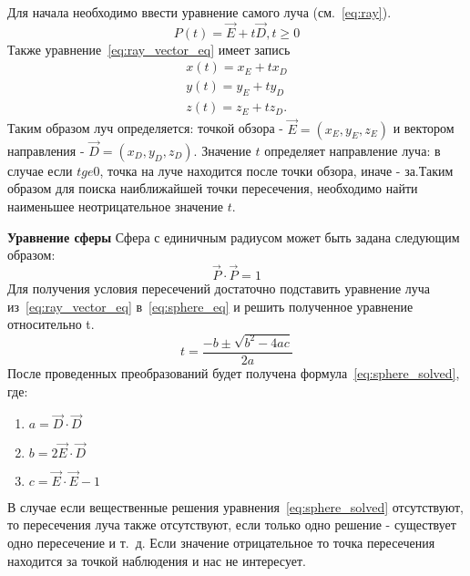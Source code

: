 Для начала необходимо ввести уравнение самого луча (см.~\ref{eq:ray}).
\begin{equation} 
	P(t) = \vec{E} +t\vec{D},t \ge 0
	\label{eq:ray_vector_eq}
\end{equation}
Также уравнение~\ref{eq:ray_vector_eq} имеет запись
\begin{equation}
	\label{eq:ray_scalar_eq}
	\begin{aligned}
		x(t) = x_E + t x_D \\
		y(t) = y_E + t y_D \\
		z(t) = z_E + t z_D.
	\end{aligned}
\end{equation}
Таким образом луч определяется: точкой обзора - $\vec{E} = (x_E,y_E,z_E)$ и вектором направления - $\vec{D} = (x_D,y_D,z_D)$. Значение $t$  определяет направление луча: в случае если $t ge 0$,
точка на луче находится после точки обзора, иначе - за.Таким образом для поиска наиближайшей точки пересечения, необходимо найти наименьшее неотрицательное значение $t$.\cite{Rodgers,primitives_raytracing_equations} 


\textbf{Уравнение сферы}
Сфера с единичным радиусом может быть задана следующим образом:
\begin{equation}
	\vec{P} \cdot \vec{P}=1
	\label{eq:sphere_eq}
\end{equation}
Для получения условия пересечений достаточно подставить уравнение луча из~\ref{eq:ray_vector_eq} в~\ref{eq:sphere_eq} и решить полученное уравнение относительно t.
\begin{equation}
	t=\frac{-b\pm\sqrt{b^2-4ac}}{2a}
	\label{eq:sphere_solved}
\end{equation}
После проведенных преобразований будет получена формула~\ref{eq:sphere_solved}, где:
\begin{enumerate}
	\item $a = \vec{D} \cdot \vec{D}$ 
	\item $b = 2\vec{E} \cdot \vec{D}$ 
	\item $c = \vec{E} \cdot \vec{E} - 1$
\end{enumerate}
В случае если вещественные решения уравнения~\ref{eq:sphere_solved} отсутствуют, то пересечения луча также отсутствуют, если только одно решение  - существует одно
пересечение и т.~д. Если значение отрицательное то точка пересечения находится за точкой наблюдения и нас не интересует.\cite{primitives_raytracing_equations}

